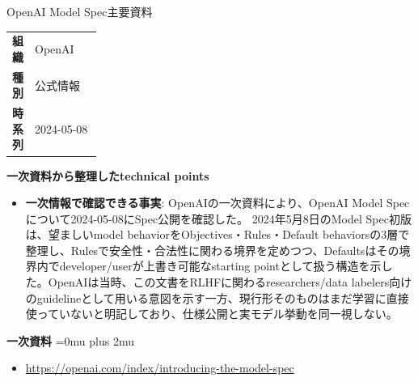 \Needspace{0.38\textheight}
\begin{technicalnote}{OpenAI Model Spec}{主要資料}
\begingroup
\begin{tabularx}{\linewidth}{@{}>{\bfseries}p{0.22\linewidth}X@{}}
組織 & OpenAI \\
種別 & 公式情報 \\
時系列 & 2024-05-08 \\
\end{tabularx}
\smallskip
\begin{minipage}{\linewidth}
{\bfseries 一次資料から整理したtechnical points}
\begin{itemize}[leftmargin=1.5em,itemsep=0.35em]
\item \textbf{一次情報で確認できる事実}: OpenAIの一次資料により、OpenAI Model Specについて2024-05-08にSpec公開を確認した。 2024年5月8日のModel Spec初版は、望ましいmodel behaviorをObjectives・Rules・Default behaviorsの3層で整理し、Rulesで安全性・合法性に関わる境界を定めつつ、Defaultsはその境界内でdeveloper/userが上書き可能なstarting pointとして扱う構造を示した。OpenAIは当時、この文書をRLHFに関わるresearchers/data labelers向けのguidelineとして用いる意図を示す一方、現行形そのものはまだ学習に直接使っていないと明記しており、仕様公開と実モデル挙動を同一視しない。
\end{itemize}
\begin{minipage}{\linewidth}
\begin{samepage}
{\bfseries 一次資料}
\begingroup\sloppy
\Urlmuskip=0mu plus 2mu\relax
\begin{itemize}[leftmargin=1.5em,itemsep=0.25em]
\item {\scriptsize\url{https://openai.com/index/introducing-the-model-spec}}
\end{itemize}
\endgroup
\end{samepage}
\end{minipage}
\end{minipage}
\endgroup
\end{technicalnote}
\medskip

